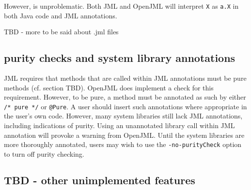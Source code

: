 However,
is unproblematic. Both JML and OpenJML will interpret \texttt{X} as \texttt{a.X} in both Java code and JML annotations.

TBD - more to be said about .jml files

\subsection{purity checks and system library annotations}

JML requires that methods that are called within JML annotations must be pure methods (cf. section TBD). OpenJML does implement
a check for this requirement. However, to be pure, a method must be annotated as such by either \texttt{/* pure */} or 
\texttt{@Pure}. A user should insert such annotations where appropriate in the user's own code. However, many system libraries 
still lack JML annotations, including indications of purity. Using an unannotated library call within JML annotation will provoke a warning from OpenJML. Until the system libraries are more thoroughly annotated, users may wish to use the \texttt{-no-purityCheck} option to turn off purity checking.

\subsection{TBD - other unimplemented features}
